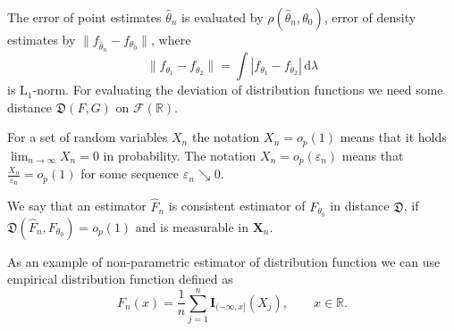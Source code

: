 The error of point estimates $\hat{\theta}_n$ is evaluated by $\rho (\hat{\theta}_n,\theta_0)$, error of density estimates by  $\| f_{\hat{\theta}_n} - f_{\theta_0} \|$, where
\begin{equation}
\| f_{\theta_1} - f_{\theta_2} \| = \int{|f_{\theta_1} - f_{\theta_2}|\,\mathrm{d}\lambda}
\end{equation}
is $\mathrm{L}_1$-norm. For evaluating the deviation of distribution functions we need some distance $\mathfrak{D}(F,G) $ on $\mathcal{F}(\mathbb{R}).$

\begin{definition} %
For a set of random variables $X_n$ the notation $X_n = o_p(1)$ means that it holds $\lim_{n \rightarrow \infty } X_n = 0$ in probability. The notation $X_n = o_p(\varepsilon_n)$ means that $\frac{X_n}{\varepsilon_n} = o_p(1)$ for some sequence $\varepsilon_n \searrow 0$.
\end{definition} 

\begin{definition} %
We say that an estimator $\hat{F}_n$ is consistent estimator of $F_{\theta_0}$ in distance $\mathfrak{D}$, if $\mathfrak{D}(\hat{F}_n, F_{\theta_0}) = o_p (1)$ and is measurable in $\mathbf{X}_n$.
\end{definition}


As an example of non-parametric estimator of distribution function we can use empirical distribution function defined as 
\begin{equation}
F_n(x)=\frac{1}{n}\sum_{j=1}^n \textbf{I}_{(-\infty,x]}(X_j), \qquad 
x\in\mathbb{R}.
\end{equation}

%
%

